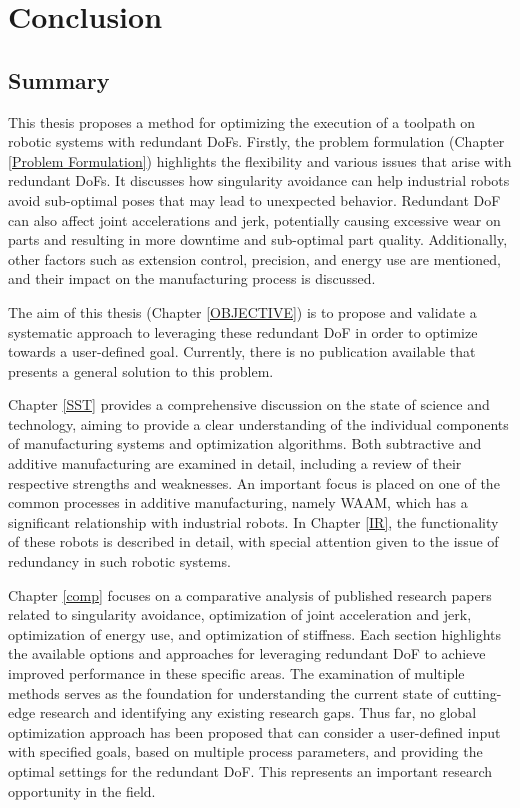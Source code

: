 \chapter{Conclusion}%
\section{Summary}%
This thesis proposes a method for optimizing the execution of a toolpath on robotic systems with redundant \acrshort{DoF}s. Firstly, the problem formulation (Chapter \ref{Problem Formulation}) highlights the flexibility and various issues that arise with redundant \acrshort{DoF}s. It discusses how singularity avoidance can help industrial robots avoid sub-optimal poses that may lead to unexpected behavior. Redundant \acrshort{DoF} can also affect joint accelerations and jerk, potentially causing excessive wear on parts and resulting in more downtime and sub-optimal part quality. Additionally, other factors such as extension control, precision, and energy use are mentioned, and their impact on the manufacturing process is discussed.

The aim of this thesis (Chapter \ref{OBJECTIVE}) is to propose and validate a systematic approach to leveraging these redundant \acrshort{DoF} in order to optimize towards a user-defined goal. Currently, there is no publication available that presents a general solution to this problem.


Chapter \ref{SST} provides a comprehensive discussion on the state of science and technology, aiming to provide a clear understanding of the individual components of manufacturing systems and optimization algorithms. Both subtractive and additive manufacturing are examined in detail, including a review of their respective strengths and weaknesses. An important focus is placed on one of the common processes in additive manufacturing, namely \acrshort{WAAM}, which has a significant relationship with industrial robots. In Chapter \ref{IR}, the functionality of these robots is described in detail, with special attention given to the issue of redundancy in such robotic systems.

Chapter \ref{comp} focuses on a comparative analysis of published research papers related to singularity avoidance, optimization of joint acceleration and jerk, optimization of energy use, and optimization of stiffness. Each section highlights the available options and approaches for leveraging redundant \acrshort{DoF} to achieve improved performance in these specific areas. The examination of multiple methods serves as the foundation for understanding the current state of cutting-edge research and identifying any existing research gaps.
Thus far, no global optimization approach has been proposed that can consider a user-defined input with specified goals, based on multiple process parameters, and providing the optimal settings for the redundant \acrshort{DoF}. This represents an important research opportunity in the field.

